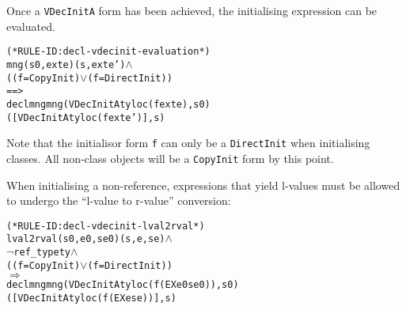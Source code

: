 \documentclass[11pt]{article}
\begin{document}
Once a \texttt{VDecInitA} form has been achieved, the initialising
expression can be evaluated.
\begin{center}
\begin{minipage}{\textwidth}
%
\begin{alltt}
(* RULE-ID: decl-vdecinit-evaluation *)
     mng (s0, exte) (s, exte') \(\land\)
     ((f = CopyInit) \(\lor\) (f = DirectInit))
   ==>
     declmng mng (VDecInitA ty loc (f exte), s0)
                 ([VDecInitA ty loc (f exte')], s)
\end{alltt}
\end{minipage}
\end{center}
Note that the initialisor form \texttt{f} can only be a
\texttt{DirectInit} when initialising classes.  All non-class objects
will be a \texttt{CopyInit} form by this point. 

When initialising a non-reference, expressions that yield l-values
must be allowed to undergo the ``l-value to r-value'' conversion:
\begin{center}
\begin{minipage}{\textwidth}
%
\begin{alltt}
(* RULE-ID: decl-vdecinit-lval2rval *)
     lval2rval (s0,e0,se0) (s,e,se) \(\land\)
     \(\neg\)ref_type ty \(\land\)
     ((f = CopyInit) \(\lor\) (f = DirectInit))
   \(\Rightarrow\)
     declmng mng (VDecInitA ty loc (f (EX e0 se0)), s0)
                 ([VDecInitA ty loc (f (EX e se))], s)
\end{alltt}
\end{minipage}
\end{center}
\end{document}
